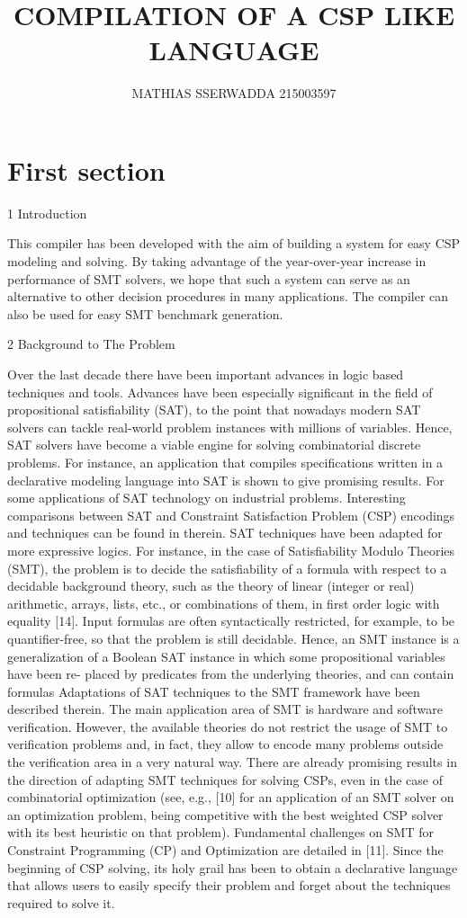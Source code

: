 \documentclass[11pt]{article} %
\title{COMPILATION OF A CSP LIKE LANGUAGE}
\author{MATHIAS SSERWADDA 215003597}
\begin{document}
\maketitle

\section{First section}

1 Introduction

This compiler has been developed with the aim of building a system for easy CSP modeling and solving. By taking advantage of the year-over-year increase in performance of SMT solvers, we hope that such a system can serve as an alternative to other decision procedures in many applications. The compiler can also be used for easy SMT benchmark generation.

2 Background to The Problem

Over the last decade there have been important advances in logic based techniques and tools. Advances have been especially significant in the field of propositional satisfiability (SAT), to the point that nowadays modern SAT solvers
can tackle real-world problem instances with millions of variables. Hence, SAT
solvers have become a viable engine for solving combinatorial discrete problems. For instance, an application that compiles specifications written in
a declarative modeling language into SAT is shown to give promising results. For some applications of SAT technology on industrial problems. Interesting comparisons between SAT and Constraint Satisfaction Problem (CSP)
encodings and techniques can be found in therein.
SAT techniques have been adapted for more expressive logics. For instance,
in the case of Satisfiability Modulo Theories (SMT), the problem is to decide
the satisfiability of a formula with respect to a decidable background theory,
such as the theory of linear (integer or real) arithmetic, arrays, lists, etc., or
combinations of them, in first order logic with equality [14]. Input formulas
are often syntactically restricted, for example, to be quantifier-free, so that
the problem is still decidable. Hence, an SMT instance is a generalization of
a Boolean SAT instance in which some propositional variables have been re-
placed by predicates from the underlying theories, and can contain formulas
Adaptations of SAT techniques to the SMT framework have been described therein.
The main application area of SMT is hardware and software verification.
However, the available theories do not restrict the usage of SMT to verification
problems and, in fact, they allow to encode many problems outside the verification area in a very natural way. There are already promising results in the
direction of adapting SMT techniques for solving CSPs, even in the case of combinatorial optimization (see, e.g., [10] for an application of an SMT solver on
an optimization problem, being competitive with the best weighted CSP solver
with its best heuristic on that problem). Fundamental challenges on SMT for
Constraint Programming (CP) and Optimization are detailed in [11].
Since the beginning of CSP solving, its holy grail has been to obtain a declarative language that allows users to easily specify their problem and forget about
the techniques required to solve it. 
\end{document}
